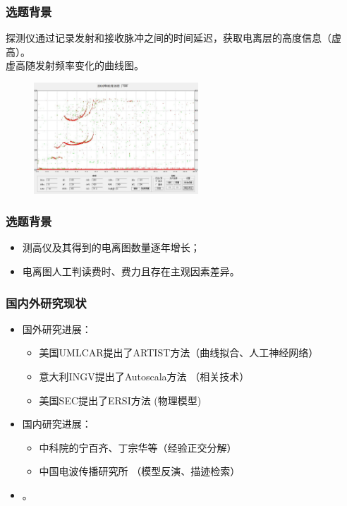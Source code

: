 \documentclass[notheorems,mathserif,table,compress]{beamer}  %
\begin{document}
\begin{frame}
  \frametitle{选题背景}
 {\color{blue}{垂直探测原理：}}
 探测仪通过记录发射和接收脉冲之间的时间延迟，获取电离层的高度信息（虚高）。\\
{\color{blue}{垂测电离图：}}虚高随发射频率变化的曲线图。
\begin{figure}[!htb] %
\centering
\includegraphics[width=0.55\textwidth]{ManualIonogram.png}
\label{fig:2}
\end{figure}
\end{frame}

\begin{frame}
  \frametitle{选题背景}
    \begin{itemize}
      \item 测高仪及其得到的电离图数量逐年增长；
      \item 电离图人工判读费时、费力且存在主观因素差异。
        \end{itemize}
  \end{frame}
  
  \begin{frame}
  \frametitle{国内外研究现状}
    \begin{itemize}
      \item[]国外研究进展：\\
           \begin{itemize}
           \item 美国UMLCAR提出了ARTIST方法（曲线拟合、人工神经网络）
            \item 意大利INGV提出了Autoscala方法 （相关技术）  
            \item 美国SEC提出了ERSI方法 (物理模型)
            \end{itemize}
      \item[]国内研究进展：
          \begin{itemize}
          \item 中科院的宁百齐、丁宗华等（经验正交分解）
          \item 中国电波传播研究所 （模型反演、描迹检索）
            \end{itemize}
         \item[] {\color{blue}{依赖于探测方式及探测仪，对电离图E区描迹的自动判读研究较少}}。
        \end{itemize}
     
  \end{frame}
\end{document}

